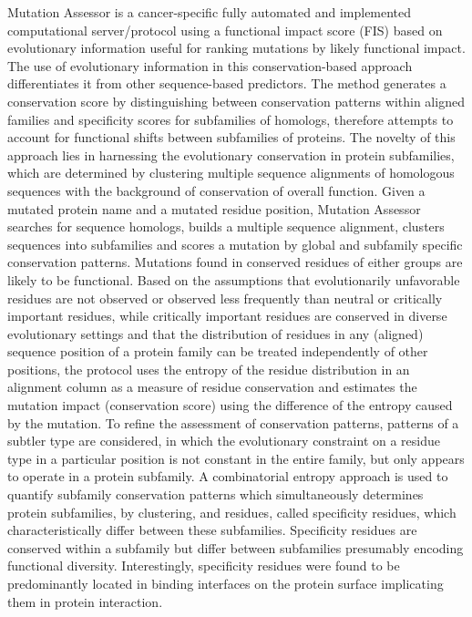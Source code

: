 \documentclass[10pt,letterpaper]{article}
\begin{document}
Mutation Assessor is a cancer-specific fully automated and implemented
computational server/protocol using a functional impact score (FIS)
based on evolutionary information useful for ranking mutations by
likely functional impact. The use of evolutionary information in this
conservation-based approach differentiates it from other
sequence-based predictors.  The method generates a conservation score
by distinguishing between conservation patterns within aligned
families and specificity scores for subfamilies of homologs, therefore
attempts to account for functional shifts between subfamilies of
proteins. The novelty of this approach lies in harnessing the
evolutionary conservation in protein subfamilies, which are determined
by clustering multiple sequence alignments of homologous sequences
with the background of conservation of overall function. Given a
mutated protein name and a mutated residue position, Mutation Assessor
searches for sequence homologs, builds a multiple sequence alignment,
clusters sequences into subfamilies and scores a mutation by global
and subfamily specific conservation patterns. Mutations found in
conserved residues of either groups are likely to be functional. Based
on the assumptions that evolutionarily unfavorable residues are not
observed or observed less frequently than neutral or critically
important residues, while critically important residues are conserved
in diverse evolutionary settings and that the distribution of residues
in any (aligned) sequence position of a protein family can be treated
independently of other positions, the protocol uses the entropy of the
residue distribution in an alignment column as a measure of residue
conservation and estimates the mutation impact (conservation score)
using the difference of the entropy caused by the mutation. To refine
the assessment of conservation patterns, patterns of a subtler type
are considered, in which the evolutionary constraint on a residue type
in a particular position is not constant in the entire family, but
only appears to operate in a protein subfamily. A combinatorial
entropy approach is used to quantify subfamily conservation patterns
which simultaneously determines protein subfamilies, by clustering,
and residues, called specificity residues, which characteristically
differ between these subfamilies. Specificity residues are conserved
within a subfamily but differ between subfamilies presumably encoding
functional diversity. Interestingly, specificity residues were found
to be predominantly located in binding interfaces on the protein
surface implicating them in protein interaction.
\end{document}
